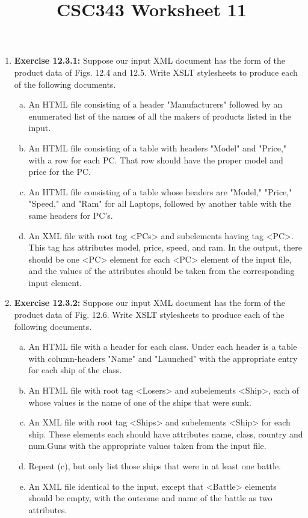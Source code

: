 \documentclass[12pt]{article}
\begin{document}
\title{CSC343 Worksheet 11}
\maketitle

\begin{enumerate}[1.]
    \item \textbf{Exercise 12.3.1:} Suppose our input XML document has the form
    of the product data of Figs. 12.4 and 12.5. Write XSLT stylesheets to produce
    each of the following documents.

    \begin{enumerate}[a)]
        \item An HTML file consisting of a header "Manufacturers" followed by an enumerated list of the names of all the makers of products listed in the input.
        \item An HTML file consisting of a table with headers "Model" and "Price," with a row for each PC. That row should have the proper model and price for the PC.
        \item An HTML file consisting of a table whose headers are "Model," "Price," "Speed," and "Ram" for all Laptops, followed by another table with the same headers for PC's.
        \item An XML file with root tag <PCs> and subelements having tag <PC>. This tag has attributes model, price, speed, and ram. In the output, there should be one <PC> element for each <PC> element of the input file, and the values of the attributes should be taken from the corresponding input element.
    \end{enumerate}

    \item \textbf{Exercise 12.3.2:} Suppose our input XML document has the form of the product
    data of Fig. 12.6. Write XSLT stylesheets to produce each of the following
    documents.

    \bigskip

    \begin{enumerate}[a)]
        \item An HTML file with a header for each class. Under each header is a table with column-headers "Name" and "Launched" with the appropriate entry for each ship of the class.
        \item An HTML file with root tag <Losers> and subelements <Ship>, each of whose values is the name of one of the ships that were sunk.
        \item An XML file with root tag <Ships> and subelements <Ship> for each ship. These elements each should have attributes name, class, country and num.Guns with the appropriate values taken from the input file.
        \item Repeat (c), but only list those ships that were in at least one battle.
        \item An XML file identical to the input, except that <Battle> elements should be empty, with the outcome and name of the battle as two attributes.
    \end{enumerate}
\end{enumerate}
\end{document}
